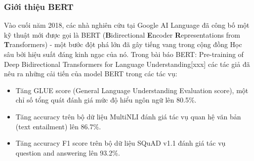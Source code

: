

\subsubsection{Giới thiệu BERT}
Vào cuối năm 2018, các nhà nghiên cứu tại Google AI Language đã công bố một kỹ thuật mới được gọi là BERT ({\bf B}idirectional {\bf E}ncoder {\bf R}epresentations from {\bf T}ransformers) - một bước đột phá lớn đã gây tiếng vang trong cộng đồng Học sâu bởi hiệu suất đáng kinh ngạc của nó. Trong bài báo BERT: Pre-training of Deep Bidirectional Transformers for Language Understanding[xxx] các tác giả đã nêu ra những cải tiến của model BERT trong các tác vụ:

\begin{itemize}
    \item Tăng GLUE score (General Language Understanding Evaluation score), một chỉ số tổng quát đánh giá mức độ hiểu ngôn ngữ lên 80.5\%.
    \item Tăng accuracy trên bộ dữ liệu MultiNLI đánh giá tác vụ quan hệ văn bản (text entailment) lên 86.7\%.
    \item Tăng accuracy F1 score trên bộ dữ liệu SQuAD v1.1 đánh giá tác vụ question and answering lên 93.2\%.
\end{itemize}

